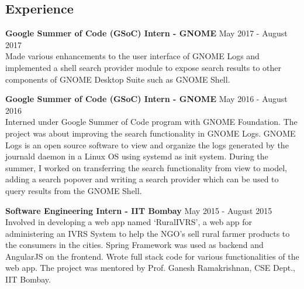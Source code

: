 \documentclass[12pt,margin, centered]{res}
\begin{document}
\begin{resume}



\section{Experience}
\vspace{10mm}

\textbf{Google Summer of Code (GSoC) Intern - GNOME} \hfill May 2017 - August 2017\\
Made various enhancements to the user interface of GNOME Logs and implemented a shell search provider module to expose search results to other components of GNOME Desktop Suite such as GNOME Shell.

\vspace{2mm}

\textbf{Google Summer of Code (GSoC) Intern - GNOME} \hfill May 2016 - August 2016\\
Interned under Google Summer of Code program with GNOME Foundation. The project was about improving the search functionality in GNOME Logs. GNOME Logs is an open source software to view and organize the logs generated by the journald daemon in a Linux OS using systemd as init system. During the summer, I worked on transferring the search functionality from view to model, adding a search popover and writing a search provider which can be used to query results from the GNOME Shell.

\vspace{2mm}

\textbf{Software Engineering Intern - IIT Bombay} \hfill May 2015 - August 2015\\
Involved in developing a web app named ‘RuralIVRS’, a web app for administering an IVRS System to help the NGO's sell rural farmer products to the consumers in the cities. Spring Framework was used as backend and AngularJS on the frontend. Wrote full stack code for various functionalities of the web app. The project was mentored by Prof. Ganesh Ramakrishnan, CSE Dept., IIT Bombay.




\end{resume}
\end{document}
